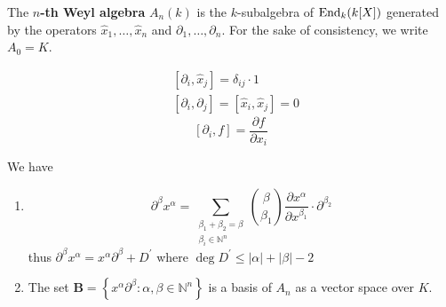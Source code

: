 \documentclass[12pt, oneside]{book}
\begin{document}
\begin{definition}
    The \textbf{$n$-th Weyl algebra} $A_n\left(k\right)$ is the $k$-subalgebra of $\operatorname{\operatorname{End}}_k(k[X])$ generated by the operators $\hat{x}_1, \ldots, \hat{x}_n$ and $\partial_1, \ldots, \partial_n$. For the sake of consistency, we write $A_0=K$.
\end{definition}



\begin{proposition}
    \begin{equation*}
        \begin{aligned}
             & {\left[\partial_i, \hat{x}_j\right]=\delta_{i j} \cdot 1} \\ & {\left[\partial_i, \partial_j\right]=\left[\hat{x}_i, \hat{x}_j\right]=0}
        \end{aligned}
    \end{equation*}
    \begin{equation*}
        \left[\partial_i,f\right]=\frac{\partial f}{\partial x_i}
    \end{equation*}
\end{proposition}

\begin{proposition}
    \label{pro: proposition of Weyl algebra}
    We have
    \begin{enumerate}
        \item
              \begin{equation*}
                  \partial^\beta x^\alpha
                  =
                  \sum_{\substack{\beta_1+\beta_2=\beta\\ \beta_i\in \mathbb{N}^n}}
                  \binom{\beta}{\beta_1} \frac{\partial x^\alpha}{\partial x^{\beta_1}}\cdot \partial^{\beta_2}
              \end{equation*}
              thus $\partial^\beta x^\alpha =  x^\alpha\partial^\beta+ D^\prime$ where $\deg D^\prime \leq \left|\alpha\right|+\left|\beta\right|-2$

        \item
              The set $\mathbf{B}=\left\{x^\alpha \partial^\beta: \alpha, \beta \in \mathbb{N}^n\right\}$ is a basis of $A_n$ as a vector space over $K$.
    \end{enumerate}
\end{proposition}
\end{document}
